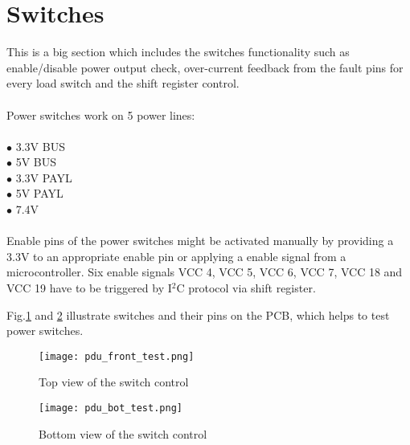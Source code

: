 \section{Switches}
This is a big section which includes the switches functionality such as enable/disable power output check, over-current feedback from the fault pins for every load switch  and the shift register control. \\
\\
Power switches work on 5 power lines:\\ \\
$\bullet$ 3.3V BUS\\
$\bullet$ 5V BUS\\
$\bullet$ 3.3V PAYL\\
$\bullet$ 5V PAYL\\
$\bullet$ 7.4V\\ \\
Enable pins of the power switches might be activated manually by providing a 3.3V to an appropriate enable pin or applying a enable signal from a microcontroller.  Six enable signals VCC 4, VCC 5, VCC 6, VCC 7, VCC 18 and VCC 19 have to be triggered by I$^2$C protocol via shift register.

 Fig.\ref{fig: pdu_test_front}  and \ref{fig: pdu_test_back} illustrate switches and their pins on the PCB, which helps to test power switches.



\begin{figure}[h]
	\centering
	\texttt{[image: pdu\_front\_test.png]}
	\caption{Top view of the switch control}
	\label{fig: pdu_test_front}
\end{figure} 

\begin{figure}[h]
	\centering
	\texttt{[image: pdu\_bot\_test.png]}
	\caption{Bottom view of the switch control}
	\label{fig: pdu_test_back}
\end{figure}

